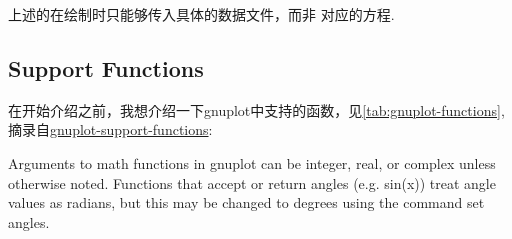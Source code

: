 \begin{remark}
    上述的\cmd{\StairsPlot, \StemPlot, \BarPlot, \ShadePlot}在绘制时只能够传入具体的数据文件，而非
    对应的方程.
\end{remark}

\subsection{Support Functions}
在开始介绍之前，我想介绍一下gnuplot中支持的函数，见\cref{tab:gnuplot-functions},
摘录自\href{http://www.bersch.net/gnuplot-doc/expressions.html#expressions-functions-floor}{gnuplot-support-functions}:

\begin{leftbar}
    Arguments to math functions in gnuplot can be integer, real, or complex unless otherwise noted.
    Functions that accept or return angles (e.g. sin(x)) treat angle values as radians, but this may 
    be changed to degrees using the command set angles.
\end{leftbar}

